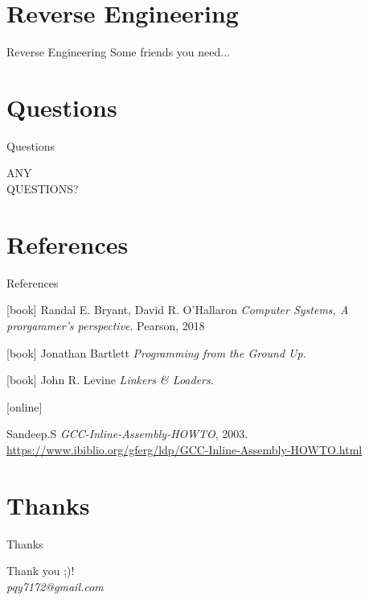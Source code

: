 \documentclass[UKenglish]{beamer}
\begin{document}
\section{Reverse Engineering}
\begin{frame}{Reverse Engineering}
Some friends you need...  
\end{frame}

\section{Questions}
\begin{frame}{Questions}
  \begin{center}
    \vspace{1.5cm}
    \Huge ANY\\
    \Huge QUESTIONS?\\
  \end{center}
\end{frame}


\section{References}
\begin{frame}[allowframebreaks]{References}
    \begin{thebibliography}{}

        [book]
         Randal E. Bryant, David R. O'Hallaron
        \newblock \emph{Computer Systems, A prorgammer's perspective}.
        \newblock Pearson, 2018
   

      [book]
          Jonathan Bartlett
        \newblock \emph{Programming from the Ground Up}.

        [book]
          John R. Levine
        \newblock \emph{Linkers \& Loaders}.

        
[online]

          Sandeep.S
        \newblock \emph{GCC-Inline-Assembly-HOWTO}, 2003.
        \newblock \url{https://www.ibiblio.org/gferg/ldp/GCC-Inline-Assembly-HOWTO.html}
   \end{thebibliography}
 \end{frame}

 \section{Thanks}

 \begin{frame}{Thanks}
   \begin{center}
     \vspace{2cm}
     \Huge Thank you ;)!\\
     
     \emph{pqy7172@gmail.com}
   \end{center}
 \end{frame}
\end{document}
